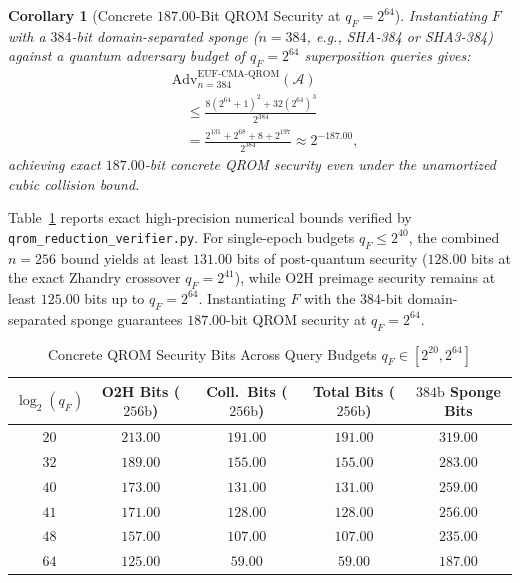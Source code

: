 \documentclass[conference,compsoc]{IEEEtran}
\newtheorem{corollary}{Corollary}
\begin{document}
\begin{corollary}[Concrete $187.00$-Bit QROM Security at $q_F = 2^{64}$]
Instantiating $F$ with a $384$-bit domain-separated sponge ($n = 384$, e.g., SHA-384 or SHA3-384) against a quantum adversary budget of $q_F = 2^{64}$ superposition queries gives:
\begin{equation}
\begin{aligned}
&\mathrm{Adv}^{\mathrm{EUF\text{-}CMA\text{-}QROM}}_{n=384}(\mathcal{A}) \\
&\quad \le \frac{8(2^{64} + 1)^2 + 32(2^{64})^3}{2^{384}} \\
&\quad = \frac{2^{131} + 2^{68} + 8 + 2^{197}}{2^{384}} \approx 2^{-187.00},
\end{aligned}
\end{equation}
achieving exact $187.00$-bit concrete QROM security even under the unamortized cubic collision bound.
\end{corollary}

Table~\ref{tab:qrom} reports exact high-precision numerical bounds verified by \texttt{qrom\_reduction\_\allowbreak verifier.py}. For single-epoch budgets $q_F \le 2^{40}$, the combined $n = 256$ bound yields at least $131.00$ bits of post-quantum security ($128.00$ bits at the exact Zhandry crossover $q_F = 2^{41}$), while O2H preimage security remains at least $125.00$ bits up to $q_F = 2^{64}$. Instantiating $F$ with the $384$-bit domain-separated sponge guarantees $187.00$-bit QROM security at $q_F = 2^{64}$.

\begin{table}[t]
\centering
\footnotesize
\caption{Concrete QROM Security Bits Across Query Budgets $q_F \in [2^{20}, 2^{64}]$}
\label{tab:qrom}
\begin{tabular}{@{}ccccc@{}}
\toprule
$\log_2(q_F)$ & O2H Bits ($256\text{b}$) & Coll.\ Bits ($256\text{b}$) & Total Bits ($256\text{b}$) & $384\text{b}$ Sponge Bits \\
\midrule
$20$ & $213.00$ & $191.00$ & $191.00$ & $319.00$ \\
$32$ & $189.00$ & $155.00$ & $155.00$ & $283.00$ \\
$40$ & $173.00$ & $131.00$ & $131.00$ & $259.00$ \\
$41$ & $171.00$ & $128.00$ & $128.00$ & $256.00$ \\
$48$ & $157.00$ & $107.00$ & $107.00$ & $235.00$ \\
$64$ & $125.00$ & $59.00$  & $59.00$  & $187.00$ \\
\bottomrule
\end{tabular}
\end{table}
\end{document}
